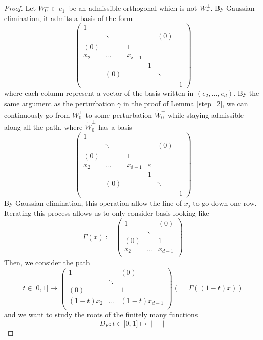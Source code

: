 \documentclass[10pt,a4paper]{amsart}
\begin{document}
\begin{proof}
    Let $W_0^\perp\subset e_1^\perp$ be an admissible orthogonal which is not $W_r^\perp$. By Gaussian elimination, it admits a basis of the form \[ \begin{pmatrix}
        1& & & & & \\
         &\ddots& & &(0)& \\
        (0)& &1& & & \\
        x_2&...&x_{i-1}& & & \\
         & & &1& & \\
         &(0)& & &\ddots& \\
         & & & & &1
    \end{pmatrix} \] where each column represent a vector of the basis written in $(e_2,...,e_d)$. By the same argument as the perturbation $\gamma$ in the proof of Lemma \ref{step_2}, we can continuously go from $W_0^\perp$ to some perturbation $\tilde W_0^\perp$ while staying admissible along all the path, where $\tilde W_0^\perp$ has a basis \[ \begin{pmatrix}
        1& & & & & \\
         &\ddots& & &(0)& \\
        (0)& &1& & & \\
        x_2&...&x_{i-1}&\varepsilon& & \\
         & & &1& & \\
         &(0)& & &\ddots& \\
         & & & & &1
    \end{pmatrix} \] By Gaussian elimination, this operation allow the line of $x_j$ to go down one row. Iterating this process allows us to only consider basis looking like \[ \Gamma(x) := \begin{pmatrix}
        1& &(0) \\
         &\ddots& \\
        (0)& &1\\
        x_2&...&x_{d-1}\\
    \end{pmatrix} \]
    Then, we consider the path \[ t \in \mathopen [0,1  \mathclose] \mapsto \begin{pmatrix}
        1& &(0) \\
         &\ddots& \\
        (0)& &1\\
        (1-t)x_2&...&(1-t)x_{d-1}\\
    \end{pmatrix} \left(= \Gamma((1-t)x)\right) \] and we want to study the roots of the finitely many functions \[ D_F : t \in \mathopen [0,1  \mathclose] \mapsto \begin{vmatrix}

\end{vmatrix}\]
\end{proof}
\end{document}
